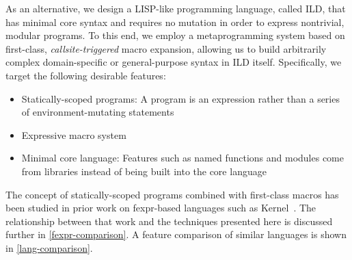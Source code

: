 As an alternative, we design a LISP-like programming language, called ILD, that
has minimal core syntax and requires no mutation in order to express
nontrivial, modular programs. To this end, we employ a
metaprogramming system based on first-class, \emph{callsite-triggered}
macro expansion, allowing us to build arbitrarily complex domain-specific or
general-purpose syntax in ILD itself. Specifically, we target the following
desirable features:
\begin{itemize}
  \item Statically-scoped programs: A program is an expression rather than a series of environment-mutating statements
  \item Expressive macro system
  \item Minimal core language: Features such as named functions and modules come from libraries instead of being built into the core language
\end{itemize}

The concept of statically-scoped programs combined with first-class macros has
been studied in prior work on fexpr-based languages such as Kernel~\cite{kernel-report,fexpr-shutt}.
The relationship between that work and the techniques presented here is
discussed further in \cref{fexpr-comparison}.
A feature comparison of similar languages is shown in \cref{lang-comparison}.

